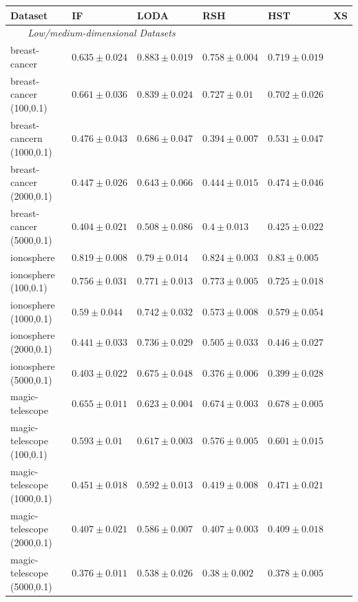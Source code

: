 \begin{footnotesize}
\begin{table}[ht!]
    \centering
		\begin{tabular}{llllll}
				\toprule
				\textbf{Dataset} & \textbf{IF} & \textbf{LODA} & \textbf{RSH} & \textbf{HST} & \textbf{XS}	\\
				\midrule
				\multicolumn{3}{c}{\textit{Low/medium-dimensional Datasets}}\\
breast-cancer& $0.635 \pm 0.024$ &  $0.883 \pm 0.019$ &  $0.758 \pm 0.004$ &  $0.719 \pm 0.019$    \\
breast-cancer (100,0.1)& $0.661 \pm 0.036$ &  $0.839 \pm 0.024$ &  $0.727 \pm 0.01$ &  $0.702 \pm 0.026$    \\
breast-cancern (1000,0.1)& $0.476 \pm 0.043$ &  $0.686 \pm 0.047$ &  $0.394 \pm 0.007$ &  $0.531 \pm 0.047$    \\
breast-cancer (2000,0.1)& $0.447 \pm 0.026$ &  $0.643 \pm 0.066$ &  $0.444 \pm 0.015$ &  $0.474 \pm 0.046$    \\
breast-cancer (5000,0.1)& $0.404 \pm 0.021$ &  $0.508 \pm 0.086$ &  $0.4 \pm 0.013$ &  $0.425 \pm 0.022$    \\
\midrule
ionosphere& $0.819 \pm 0.008$ &  $0.79 \pm 0.014$ &  $0.824 \pm 0.003$ &  $0.83 \pm 0.005$    \\
ionosphere (100,0.1)& $0.756 \pm 0.031$ &  $0.771 \pm 0.013$ &  $0.773 \pm 0.005$ &  $0.725 \pm 0.018$    \\
ionosphere (1000,0.1)& $0.59 \pm 0.044$ &  $0.742 \pm 0.032$ &  $0.573 \pm 0.008$ &  $0.579 \pm 0.054$    \\
ionosphere (2000,0.1)& $0.441 \pm 0.033$ &  $0.736 \pm 0.029$ &  $0.505 \pm 0.033$ &  $0.446 \pm 0.027$    \\
ionosphere (5000,0.1)& $0.403 \pm 0.022$ &  $0.675 \pm 0.048$ &  $0.376 \pm 0.006$ &  $0.399 \pm 0.028$    \\
\midrule
magic-telescope& $0.655 \pm 0.011$ &  $0.623 \pm 0.004$ &  $0.674 \pm 0.003$ &  $0.678 \pm 0.005$    \\
magic-telescope (100,0.1)& $0.593 \pm 0.01$ &  $0.617 \pm 0.003$ &  $0.576 \pm 0.005$ &  $0.601 \pm 0.015$    \\
magic-telescope (1000,0.1)& $0.451 \pm 0.018$ &  $0.592 \pm 0.013$ &  $0.419 \pm 0.008$ &  $0.471 \pm 0.021$    \\
magic-telescope (2000,0.1)& $0.407 \pm 0.021$ &  $0.586 \pm 0.007$ &  $0.407 \pm 0.003$ &  $0.409 \pm 0.018$    \\
magic-telescope (5000,0.1)& $0.376 \pm 0.011$ &  $0.538 \pm 0.026$ &  $0.38 \pm 0.002$ &  $0.378 \pm 0.005$    \\

\end{tabular}
\end{table}
\end{footnotesize}
